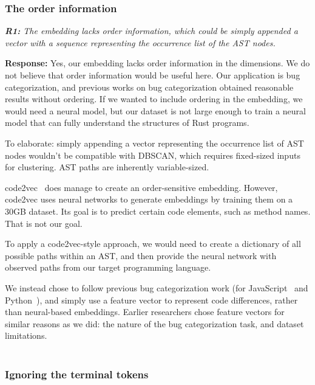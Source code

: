 \documentclass{article}
\begin{document}
\subsubsection{\label{rev:1:order}The order information}

\noindent \textit{\textbf{R1:} The embedding lacks order information, which could be simply appended a vector with a sequence representing the occurrence list of the AST nodes.}

\vspace*{1em} \noindent \textbf{Response:} Yes, our embedding lacks order information in the dimensions. We do not believe that order information would be useful here. Our application is bug categorization, and previous works on bug categorization obtained reasonable results without ordering. If we wanted to include ordering in the embedding, we would need a neural model, but our dataset is not large enough to train a neural model that can fully understand the structures of Rust programs. 

To elaborate: simply appending a vector representing the occurrence list of AST nodes wouldn't be compatible with DBSCAN, which requires fixed-sized inputs for clustering. AST paths are inherently variable-sized.

code2vec~\cite{alon2019code2vec} does manage to create an order-sensitive embedding. However, code2vec uses neural networks to generate embeddings by training them on a 30GB dataset. Its goal is to predict certain code elements, such as method names. That is not our goal.

To apply a code2vec-style approach, we would need to create a dictionary of all possible paths within an AST, and then provide the neural network with observed paths from our target programming language.

We instead chose to follow previous bug categorization work (for JavaScript~\cite{hanam2016discovering} and Python~\cite{yang2022mining}), and simply use a feature vector to represent code differences, rather than neural-based embeddings. Earlier researchers chose feature vectors for similar reasons as we did: the nature of the bug categorization task, and dataset limitations. \\ \\

\subsubsection{\label{rev:1:terminal}Ignoring the terminal tokens}
\end{document}
